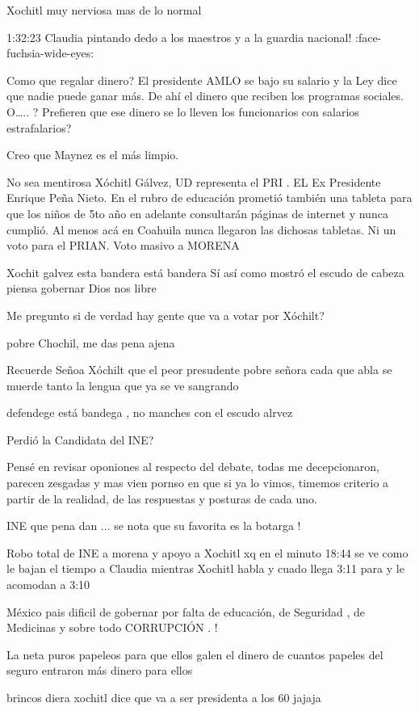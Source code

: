 Xochitl muy nerviosa mas de lo normal

1:32:23 Claudia pintando dedo a los maestros y a la guardia nacional! :face-fuchsia-wide-eyes:

Como que regalar dinero?    El presidente AMLO se bajo su salario y la Ley dice que nadie puede ganar más. De ahí el dinero que reciben los programas sociales.   O….. ? Prefieren que ese dinero se lo lleven los funcionarios con salarios estrafalarios?

Creo que Maynez es el más limpio.

No sea mentirosa Xóchitl Gálvez, UD representa el PRI . 
EL Ex Presidente Enrique Peña Nieto.
En el rubro de educación prometió también una tableta para que los niños de 5to año en adelante consultarán páginas de internet y nunca cumplió. Al menos acá en Coahuila nunca llegaron las dichosas tabletas.
Ni un voto para el PRIAN.
Voto masivo a MORENA 🎉

Xochit galvez esta bandera está bandera
Sí así como mostró el escudo de cabeza piensa gobernar
Dios nos libre

Me pregunto si de verdad hay gente que va a votar por Xóchilt?👀

pobre Chochil, me das pena ajena

Recuerde Señoa Xóchilt que el peor presudente pobre señora cada que abla se muerde tanto la lengua que ya se ve sangrando

defendege está bandega , no manches con el escudo alrvez

Perdió la Candidata del INE?

Pensé en revisar oponiones al respecto del debate,  todas me decepcionaron, parecen zesgadas y mas vien pornso en que si ya lo vimos, timemos criterio a partir de la realidad, de las respuestas y posturas de cada uno.

INE  que pena dan ... se nota que su favorita es la botarga !

Robo total de INE a morena y apoyo a Xochitl xq en el minuto 18:44 se ve como le bajan el tiempo a Claudia mientras Xochitl habla y  cuado llega 3:11 para y le acomodan a 3:10

México pais dificil de gobernar por falta de educación, de Seguridad , de Medicinas y sobre todo CORRUPCIÓN . !

La neta puros papeleos para que ellos galen el dinero de cuantos papeles del seguro entraron más dinero para ellos

brincos diera xochitl dice que va a ser presidenta a los 60 jajaja

